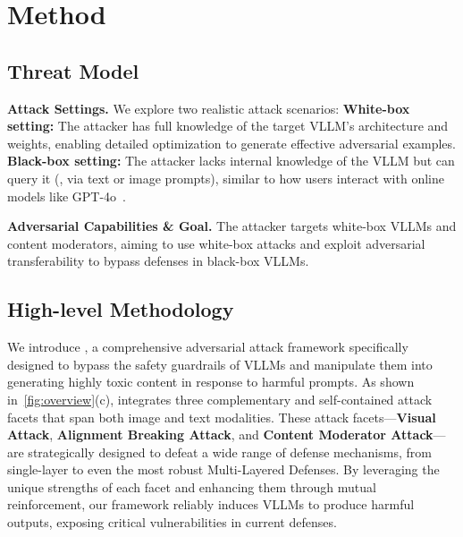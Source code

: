 \section{Method}
\subsection{Threat Model}
\label{sec:threat_model}


\noindent\textbf{Attack Settings.} We explore two realistic attack scenarios:
 \textbf{White-box setting:} The attacker has full knowledge of the target VLLM’s architecture and weights, enabling detailed optimization to generate effective adversarial examples.  \textbf{Black-box setting:} The attacker lacks internal knowledge of the VLLM but can query it (\eg, via text or image prompts), similar to how users interact with online models like GPT-4o~\cite{openai2024gpt4ocard}. 

\noindent\textbf{Adversarial Capabilities \& Goal.} The attacker targets white-box VLLMs and content moderators, aiming to use white-box attacks and exploit adversarial transferability to bypass defenses in black-box VLLMs.


\subsection{High-level Methodology}
We introduce \textbf{\mfa}, a comprehensive adversarial attack framework specifically designed to bypass the safety guardrails of VLLMs and manipulate them into generating highly toxic content in response to harmful prompts. As shown in~\cref{fig:overview}(c), \mfa integrates three complementary and self-contained attack facets that span both image and text modalities. These attack facets—\textbf{Visual Attack}, \textbf{Alignment Breaking Attack}, and \textbf{Content Moderator Attack}—are strategically designed to defeat a wide range of defense mechanisms, from single-layer to even the most robust Multi-Layered Defenses. By leveraging the unique strengths of each facet and enhancing them through mutual reinforcement, our framework reliably induces VLLMs to produce harmful outputs, exposing critical vulnerabilities in current defenses. 


